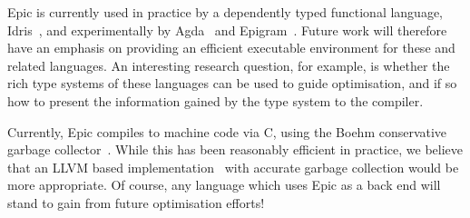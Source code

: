 Epic is currently used in practice by a dependently typed functional
language, Idris~\cite{plpv11}, and experimentally by
Agda~\cite{norell-thesis} and Epigram~\cite{levitation}. Future work
will therefore have an emphasis on providing an efficient executable
environment for these and related languages. An interesting research
question, for example, is whether the rich type systems of these languages
can be used to guide optimisation, and if so how to present the
information gained by the type system to the compiler.

Currently, Epic compiles to machine code via C, using the Boehm
conservative garbage collector~\cite{boehm-gc}. While this has been
reasonably efficient in practice, we believe that an LLVM based
implementation~\cite{llvm,llvm-haskell} with accurate garbage
collection would be more appropriate. Of course, any language which
uses Epic as a back end will stand to gain from future optimisation
efforts!
